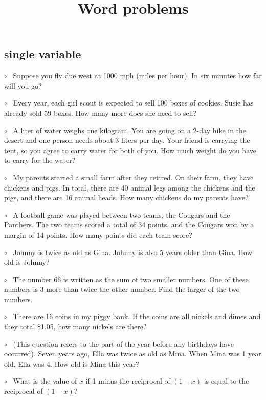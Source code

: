 \documentclass[11pt, oneside]{article}
\title{Word problems}
\date{}
\begin{document}
\maketitle
\Large


\subsection*{single variable}

$\circ$ \ Suppose you fly due west at 1000 mph (miles per hour).  In six minutes how far will you go?

$\circ$ \ Every year, each girl scout is expected to sell 100 boxes of cookies.  Susie has already sold 59 boxes.  How many more does she need to sell?

$\circ$ \ A liter of water weighs one kilogram.  You are going on a 2-day hike in the desert and one person needs about 3 liters per day.  Your friend is carrying the tent, so you agree to carry water for both of you.  How much weight do you have to carry for the water?

$\circ$ \ My parents started a small farm after they retired. On their farm, they have chickens and pigs. In total, there are 40 animal legs among the chickens and the pigs, and there are 16 animal heads. How many chickens do my parents have?

$\circ$ \ A football game was played between two teams, the Cougars and the Panthers. The two teams scored a total of 34 points, and the Cougars won by a margin of 14 points. How many points did each team score?

$\circ$ \ Johnny is twice as old as Gina.  Johnny is also 5 years older than Gina.  How old is Johnny?

$\circ$ \ The number 66 is written as the sum of two smaller numbers.  One of these numbers is 3 more than twice the other number.  Find the larger of the two numbers.

$\circ$ \ There are 16 coins in my piggy bank.  If the coins are all nickels and dimes and they total \$1.05, how many nickels are there?

$\circ$ \ (This question refers to the part of the year before any birthdays have occurred).  Seven years ago, Ella was twice as old as Mina.  When Mina was 1 year old, Ella was 4.  How old is Mina this year?

$\circ$ \ What is the value of $x$ if 1 minus the reciprocal of $(1-x)$ is equal to the reciprocal of $(1-x)$?
\end{document}
